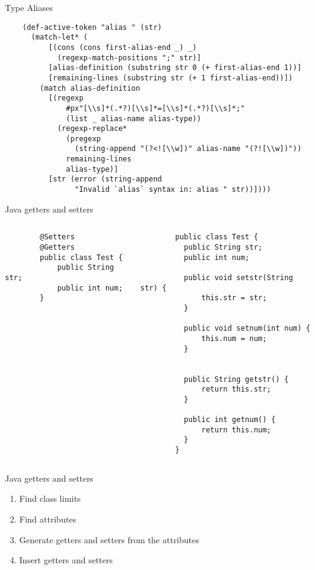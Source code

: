 \documentclass[13pt]{beamer}
\begin{document}
\begin{frame}[fragile]{Type Aliases}
  \note{
    
  }
  \begin{verbatim}
    (def-active-token "alias " (str)
      (match-let* (
          [(cons (cons first-alias-end _) _)
            (regexp-match-positions ";" str)]
          [alias-definition (substring str 0 (+ first-alias-end 1))]
          [remaining-lines (substring str (+ 1 first-alias-end))])
        (match alias-definition
          [(regexp
              #px"[\\s]*(.*?)[\\s]*=[\\s]*(.*?)[\\s]*;"
              (list _ alias-name alias-type))
            (regexp-replace*
              (pregexp
                (string-append "(?<![\\w])" alias-name "(?![\\w])"))
              remaining-lines
              alias-type)]
          [str (error (string-append
                "Invalid `alias` syntax in: alias " str))])))

 \end{verbatim}
\end{frame}

\begin{frame}[fragile]{Java getters and setters}
  \note{
    
  }
  \begin{columns}
      \begin{verbatim}
        @Setters
        @Getters
        public class Test {
            public String str;
            public int num;
        }
     \end{verbatim}
      \begin{verbatim}
        public class Test {
          public String str;
          public int num;

          public void setstr(String str) {
              this.str = str;
          }

          public void setnum(int num) {
              this.num = num;
          }


          public String getstr() {
              return this.str;
          }

          public int getnum() {
              return this.num;
          }
        }
      \end{verbatim}
  \end{columns}

\end{frame}

\begin{frame}[fragile]{Java getters and setters}
  \note{
    
  }
  
  \begin{enumerate}
    \item Find class limits
    \item Find attributes
    \item Generate getters and setters from the attributes
    \item Insert getters and setters
  \end{enumerate}
\end{frame}
\end{document}
